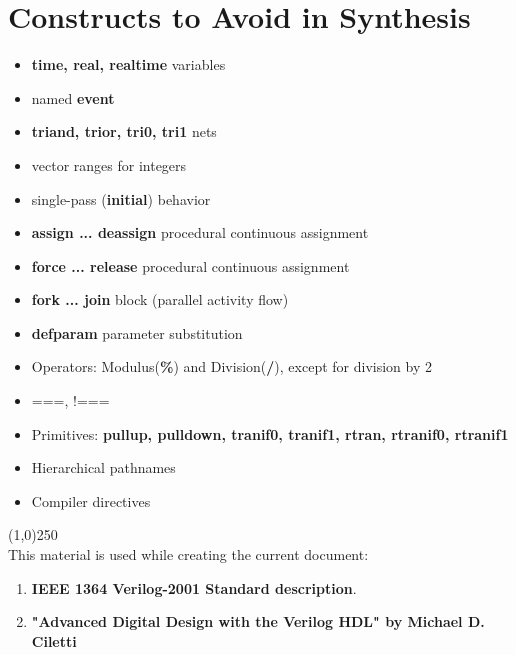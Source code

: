 \documentclass[10pt,twocolumn]{article}
\begin{document}
\section*{Constructs to Avoid in Synthesis}\vspace{-10pt}
\begin{itemize} \itemsep0pt \parskip0pt 
        \item           \textbf{time, real, realtime} variables
        \item           named \textbf{event}
        \item           \textbf{triand, trior, tri0, tri1} nets
        \item           vector ranges for integers
        \item           single-pass (\textbf{initial}) behavior
        \item           \textbf{assign ... deassign} procedural continuous assignment
        \item           \textbf{force ... release} procedural continuous assignment
        \item           \textbf{fork ... join} block (parallel activity flow)
        \item           \textbf{defparam} parameter substitution
        \item           Operators: Modulus(\textbf{\%}) and Division(\textbf{/}), except for division by 2%
        \item           ===, !===
        \item           Primitives: \textbf{pullup, pulldown, tranif0, tranif1, rtran, rtranif0, rtranif1}
        \item           Hierarchical pathnames
        \item           Compiler directives
\end{itemize}
%
\line(1,0){250}\\
This material is used while creating the current document:
\begin{enumerate} \itemsep0pt \parskip0pt 
        \item   \textbf{IEEE 1364 Verilog-2001 Standard description}.
        \item   \textbf{"Advanced Digital Design with the Verilog HDL" by Michael D. Ciletti}
\end{enumerate}
\end{document}
